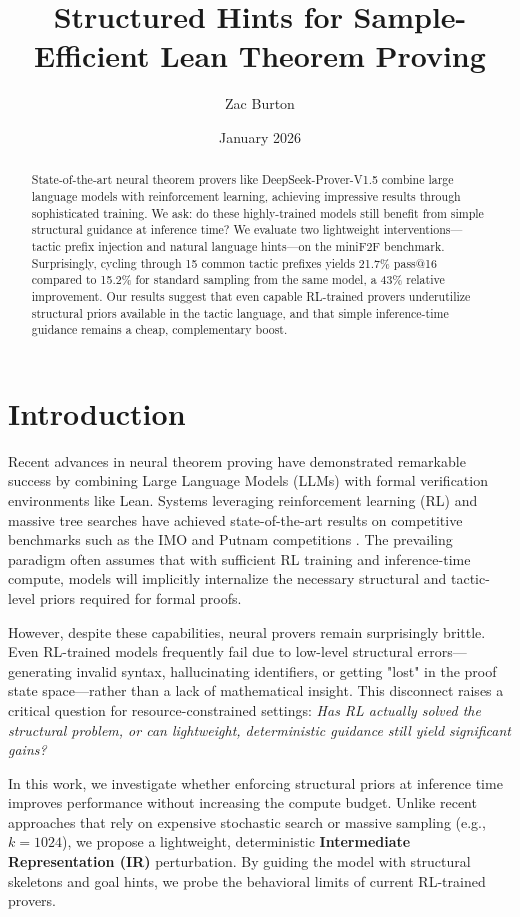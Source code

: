 \documentclass{article}
\title{Structured Hints for Sample-Efficient Lean Theorem Proving}
\author{Zac Burton}
\date{January 2026}
\begin{document}
\maketitle

\begin{abstract}
State-of-the-art neural theorem provers like DeepSeek-Prover-V1.5 combine large language models with reinforcement learning, achieving impressive results through sophisticated training. We ask: do these highly-trained models still benefit from simple structural guidance at inference time? We evaluate two lightweight interventions—tactic prefix injection and natural language hints—on the miniF2F benchmark. Surprisingly, cycling through 15 common tactic prefixes yields 21.7\% pass@16 compared to 15.2\% for standard sampling from the same model, a 43\% relative improvement. Our results suggest that even capable RL-trained provers underutilize structural priors available in the tactic language, and that simple inference-time guidance remains a cheap, complementary boost.
\end{abstract}

\section{Introduction}

Recent advances in neural theorem proving have demonstrated remarkable success by combining Large Language Models (LLMs) with formal verification environments like Lean. Systems leveraging reinforcement learning (RL) and massive tree searches have achieved state-of-the-art results on competitive benchmarks such as the IMO and Putnam competitions \cite{xin2024deepseek, chen2025seed, trinh2024solving}. The prevailing paradigm often assumes that with sufficient RL training and inference-time compute, models will implicitly internalize the necessary structural and tactic-level priors required for formal proofs.

However, despite these capabilities, neural provers remain surprisingly brittle. Even RL-trained models frequently fail due to low-level structural errors—generating invalid syntax, hallucinating identifiers, or getting "lost" in the proof state space—rather than a lack of mathematical insight. This disconnect raises a critical question for resource-constrained settings: \textit{Has RL actually solved the structural problem, or can lightweight, deterministic guidance still yield significant gains?}

In this work, we investigate whether enforcing structural priors at inference time improves performance without increasing the compute budget. Unlike recent approaches that rely on expensive stochastic search or massive sampling (e.g., $k=1024$), we propose a lightweight, deterministic \textbf{Intermediate Representation (IR)} perturbation. By guiding the model with structural skeletons and goal hints, we probe the behavioral limits of current RL-trained provers.
\end{document}
